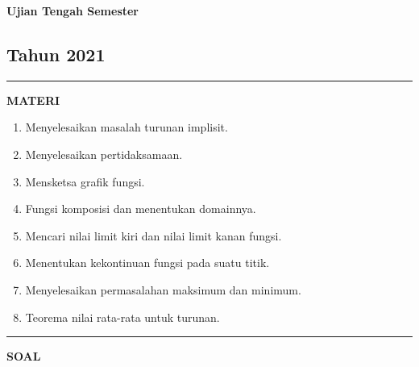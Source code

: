 \newpage
\begin{flushright}
    \textbf{\Large{Ujian Tengah Semester}}
    \subsection*{Tahun 2021}
\end{flushright}
\vspace{0.5cm}
\hrule height 2pt
\vspace{0.5cm}
\begin{center}
    \textbf{\large{MATERI}}
    \begin{enumerate}[leftmargin=*, label={\arabic*}.]
        \item Menyelesaikan masalah turunan implisit.
        \item Menyelesaikan pertidaksamaan.
        \item Mensketsa grafik fungsi.
        \item Fungsi komposisi dan menentukan domainnya.
        \item Mencari nilai limit kiri dan nilai limit kanan fungsi.
        \item Menentukan kekontinuan fungsi pada suatu titik.
        \item Menyelesaikan permasalahan maksimum dan minimum.
        \item Teorema nilai rata-rata untuk turunan.
    \end{enumerate}
\end{center}
\vspace{0.2cm}
\hrule height 1pt
\vspace{0.5cm}
\begin{center}
    \textbf{\large{SOAL}}
\end{center}
